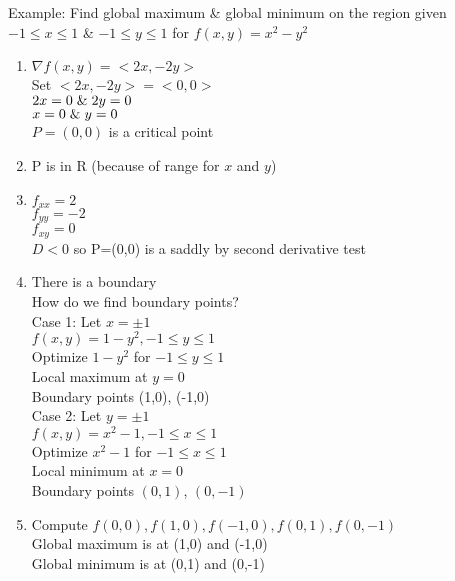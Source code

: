 \documentclass[12pt,letterpaper, onecolumn]{exam}
\begin{document}
		Example: Find global maximum \& global minimum on the region given $-1 \leq x \leq 1$ \& $-1\leq y \leq 1$ for $f(x,y)=x^2-y^2$
		\begin{enumerate}
			\item $\nabla f(x,y)=<2x,-2y>$\\
			Set $<2x,-2y>=<0,0>$\\
			$2x=0 \hspace*{0.10cm}\&\hspace*{0.10cm} 2y=0$\\
			$x=0 \hspace*{0.10cm}\&\hspace*{0.10cm}y=0$\\
			$P=(0,0)$ is a critical point
			\item P is in R (because of range for $x$ and $y$)
			\item $f_{xx}=2$\\
			$f_{yy}=-2$\\
			$f_{xy}=0$\\
			$D<0$ so P=(0,0) is a saddly by second derivative test\\
			\item There is a boundary\\
			How do we find boundary points?\\
			Case 1: Let $x=\pm 1$\\
			$f(x,y)=1-y^2, -1\leq y \leq 1$\\
			Optimize $1-y^2$ for $-1 \leq y \leq 1$\\
			Local maximum at $y=0$\\
			Boundary points (1,0), (-1,0)\\
			Case 2: Let $y=\pm 1$\\
			$f(x,y)=x^2-1, -1\leq x \leq 1$\\
			Optimize $x^2-1$ for $-1\leq x \leq 1$\\
			Local minimum at $x=0$\\
			Boundary points $(0,1)$, $(0,-1)$
			\item Compute $f(0,0), f(1,0), f(-1,0), f(0,1), f(0,-1)$\\
			Global maximum is at (1,0) and (-1,0)\\
			Global minimum is at (0,1) and (0,-1)\\
		\end{enumerate}
\end{document}
